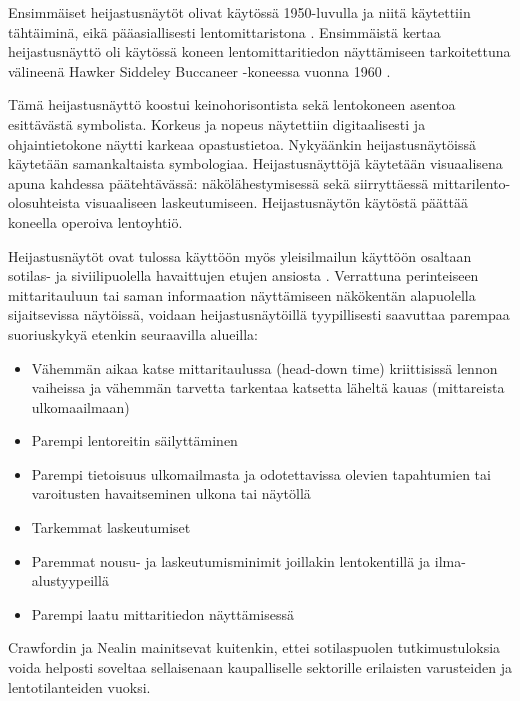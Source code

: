 \documentclass[utf8,bachelor,manualbib]{gradu3}
\begin{document}
Ensimmäiset heijastusnäytöt olivat käytössä 1950-luvulla ja niitä käytettiin tähtäiminä, eikä pääasiallisesti lentomittaristona \citep{crawfordneal2006}. Ensimmäistä kertaa heijastusnäyttö oli käytössä koneen lentomittaritiedon näyttämiseen tarkoitettuna välineenä Hawker Siddeley Buccaneer -koneessa vuonna 1960 \citep{weintraubensing1992}.

Tämä heijastusnäyttö koostui keinohorisontista sekä lentokoneen asentoa esittävästä symbolista. Korkeus ja nopeus näytettiin digitaalisesti ja ohjaintietokone näytti karkeaa opastustietoa. Nykyäänkin heijastusnäytöissä käytetään samankaltaista symbologiaa. Heijastusnäyttöjä käytetään visuaalisena apuna kahdessa päätehtävässä: näkölähestymisessä sekä siirryttäessä mittarilento-olosuhteista visuaaliseen laskeutumiseen. Heijastusnäytön käytöstä päättää koneella operoiva lentoyhtiö. \citep{crawfordneal2006}

Heijastusnäytöt ovat tulossa käyttöön myös yleisilmailun käyttöön osaltaan sotilas- ja siviilipuolella havaittujen etujen ansiosta \citep{ververswickens1998}.  Verrattuna perinteiseen mittaritauluun tai saman informaation näyttämiseen näkökentän alapuolella sijaitsevissa näytöissä, voidaan heijastusnäytöillä tyypillisesti saavuttaa parempaa suoriuskykyä etenkin seuraavilla alueilla:

\begin{itemize}
\item Vähemmän aikaa katse mittaritaulussa (head-down time) kriittisissä lennon vaiheissa ja vähemmän tarvetta tarkentaa katsetta läheltä kauas (mittareista ulkomaailmaan) \citep{maywickens1995}
\item Parempi lentoreitin säilyttäminen \citep{fischerym1980, lauberym1982, wickenslong1995}
\item Parempi tietoisuus ulkomailmasta ja odotettavissa olevien tapahtumien tai varoitusten havaitseminen ulkona tai näytöllä \citep{fischer1979, larishwickens1991, maywickens1995, wickenslong1995}
\item Tarkemmat laskeutumiset \citep{naish1964}
\item Paremmat nousu- ja laskeutumisminimit joillakin lentokentillä ja ilma-alustyypeillä \citep{crawfordneal2006}
\item Parempi laatu mittaritiedon näyttämisessä \citep{maywickens1995}
\end{itemize}

Crawfordin ja Nealin \citeyearpar{crawfordneal2006} mainitsevat kuitenkin, ettei sotilaspuolen tutkimustuloksia voida helposti soveltaa sellaisenaan kaupalliselle sektorille erilaisten varusteiden ja lentotilanteiden vuoksi.
\end{document}
